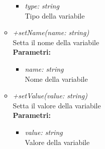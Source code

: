 \begin{itemize}
\begin{itemize}
    		\begin{itemize}
    			\item \emph{type: string}\\
    			Tipo della variabile
    		\end{itemize}
    		\item \emph{+setName(name: string)}\\
    		Setta il nome della variabile\\
    		\textbf{Parametri:}
    		\begin{itemize}
    			\item \emph{name: string}\\
    			Nome della variabile
    		\end{itemize}
    		\item \emph{+setValue(value: string)}\\
    		Setta il valore della variabile\\
    		\textbf{Parametri:}
    		\begin{itemize}
    			\item \emph{value: string}\\
    			Valore della variabile
    		\end{itemize}
    	\end{itemize}
\end{itemize}